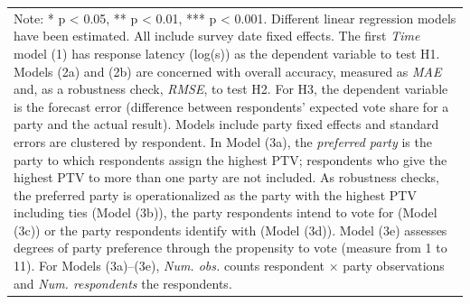\begin{table}[t]
\begin{tabular}{l *{8}{>{\centering\arraybackslash}p{2cm}}}
\bottomrule
\multicolumn{9}{l}{\parbox{\dimexpr\linewidth-2\tabcolsep\relax}{\scriptsize{Note: * p < 0.05, ** p < 0.01, *** p < 0.001. Different linear regression models have been estimated. All include survey date fixed effects. The first \textit{Time} model (1) has response latency (log(s)) as the dependent variable to test H1. Models (2a) and (2b) are concerned with overall accuracy, measured as \textit{MAE} and, as a robustness check, \textit{RMSE}, to test H2. For H3, the dependent variable is the forecast error (difference between respondents' expected vote share for a party and the actual result). Models include party fixed effects and standard errors are clustered by respondent. In Model (3a), the \textit{preferred party} is the party to which respondents assign the highest PTV; respondents who give the highest PTV to more than one party are not included. As robustness checks, the preferred party is operationalized as the party with the highest PTV including ties (Model (3b)), the party respondents intend to vote for (Model (3c)) or the party respondents identify with (Model (3d)). Model (3e) assesses degrees of party preference through the propensity to vote (measure from 1 to 11). For Models (3a)--(3e), \textit{Num. obs.} counts respondent $\times$ party observations and \textit{Num. respondents} the respondents.}}}
\end{tabular}
\label{tab:models_saxony}
\end{table}
